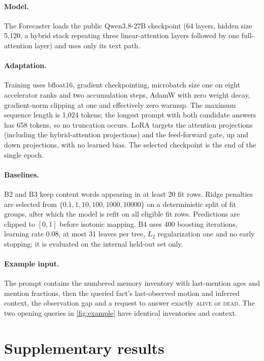 \documentclass[10pt]{article}
\newcommand{\alive}{\textsc{alive}}
\newcommand{\dead}{\textsc{dead}}
\begin{document}
\paragraph{Model.} The Forecaster loads the public Qwen3.8-27B checkpoint (64 layers, hidden size 5,120, a hybrid stack repeating three linear-attention layers followed by one full-attention layer) and uses only its text path.

\paragraph{Adaptation.} Training uses bfloat16, gradient checkpointing, microbatch size one on eight accelerator ranks and two accumulation steps, AdamW with zero weight decay, gradient-norm clipping at one and effectively zero warmup. The maximum sequence length is 1,024 tokens; the longest prompt with both candidate answers has 658 tokens, so no truncation occurs. LoRA targets the attention projections (including the hybrid-attention projections) and the feed-forward gate, up and down projections, with no learned bias. The selected checkpoint is the end of the single epoch.

\paragraph{Baselines.} B2 and B3 keep content words appearing in at least 20 fit rows. Ridge penalties are selected from $\{0.1, 1, 10, 100, 1000, 10000\}$ on a deterministic split of fit groups, after which the model is refit on all eligible fit rows. Predictions are clipped to $[0,1]$ before isotonic mapping. B4 uses 400 boosting iterations, learning rate 0.08, at most 31 leaves per tree, $L_2$ regularization one and no early stopping; it is evaluated on the internal held-out set only.

\paragraph{Example input.} The prompt contains the numbered memory inventory with last-mention ages and mention fractions, then the queried fact's last-observed motion and inferred context, the observation gap and a request to answer exactly \alive{} or \dead{}. The two opening queries in \cref{fig:example} have identical inventories and context.

\section{Supplementary results}
\label{app:results}
\end{document}
